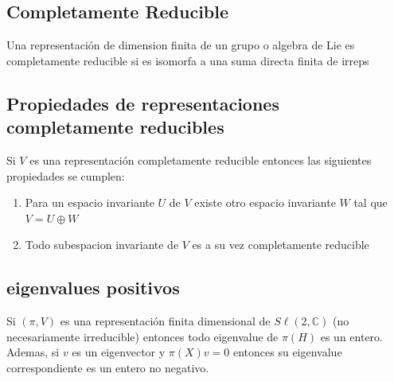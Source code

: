 \documentclass[12pt]{exam}
\begin{document}
\subsection{Completamente Reducible}\label{sec:compl_reducible}

Una representación de dimension finita de un grupo o algebra de Lie es completamente reducible si es isomorfa a una suma directa finita de irreps

\subsection{Propiedades de representaciones completamente reducibles}\label{sec:prop_compl_reducible}

Si $V$ es una representación completamente reducible entonces las siguientes propiedades se cumplen:

\begin{enumerate}
  \item Para un espacio invariante $U$ de $V$ existe otro espacio invariante $W$ tal que $V = U \oplus W$
  \item Todo subespacion invariante de $V$ es a su vez completamente reducible
\end{enumerate}

\subsection{eigenvalues positivos}\label{sec:prop_4_34}

Si $(\pi, V)$ es una representación finita dimensional de $S\ell(2, \mathbb{C})$ (no necesariamente irreducible) entonces todo eigenvalue de $\pi(H)$ es un entero. Ademas, si $v$ es un eigenvector y $\pi(X)v = 0$ entonces su eigenvalue correspondiente es un entero no negativo.
\end{document}
